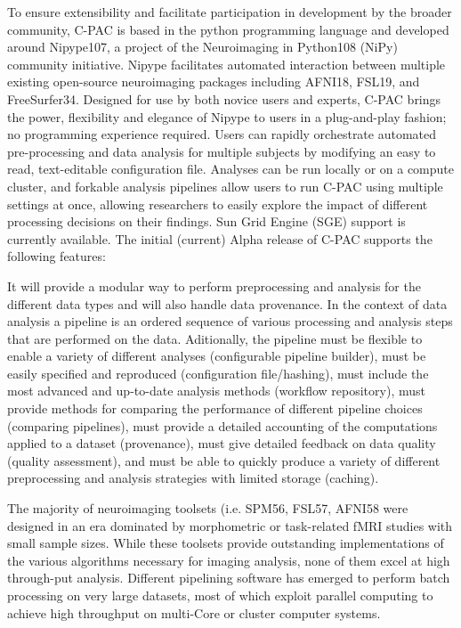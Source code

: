 To ensure extensibility and facilitate participation in development by the broader community, C-PAC is based in the python programming language and developed around Nipype107, a project of the Neuroimaging in Python108 (NiPy) community initiative. Nipype facilitates automated interaction between multiple existing open-source neuroimaging packages including AFNI18, FSL19, and FreeSurfer34. Designed for use by both novice users and experts, C-PAC brings the power, flexibility and elegance of Nipype to users in a plug-and-play fashion; no programming experience required. Users can rapidly orchestrate automated pre-processing and data analysis for multiple subjects by modifying an easy to read, text-editable configuration file. Analyses can be run locally or on a compute cluster, and forkable analysis pipelines allow users to run C-PAC using multiple settings at once, allowing researchers to easily explore the impact of different processing decisions on their findings. Sun Grid Engine (SGE) support is currently available.  The initial (current) Alpha release of C-PAC supports the following features:

It will provide a modular way to perform preprocessing and analysis for the different data types and will also handle data provenance. In the context of data analysis a pipeline is an ordered sequence of various processing and analysis steps that are performed on the data. Aditionally, the pipeline must be flexible to enable a variety of different analyses (configurable pipeline builder), must be easily specified and reproduced (configuration file/hashing), must include the most advanced and up-to-date analysis methods (workflow repository), must provide methods for comparing the performance of different pipeline choices (comparing pipelines), must provide a detailed accounting of the computations applied to a dataset (provenance), must give detailed feedback on data quality (quality assessment), and must be able to quickly produce a variety of different preprocessing and analysis strategies with limited storage (caching).

The majority of neuroimaging toolsets (i.e. SPM56, FSL57, AFNI58 were designed in an era dominated by morphometric or task-related fMRI studies with small sample sizes. While these toolsets provide outstanding implementations of the various algorithms necessary for imaging analysis, none of them excel at high through-put analysis. Different pipelining software has emerged to perform batch processing on very large datasets, most of which exploit parallel computing to achieve high throughput on multi-Core or cluster computer systems.

